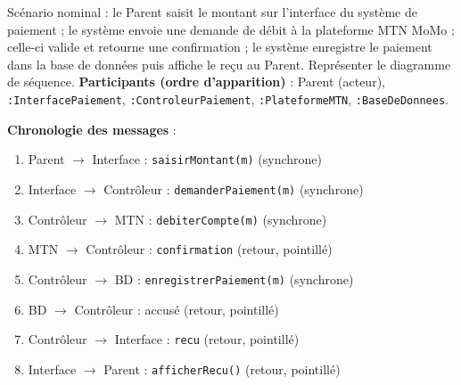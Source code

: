 \documentclass[11pt]{article}
\begin{document}
\begin{exoresolu}
Scénario nominal : le Parent saisit le montant sur l'interface du système de paiement ; le système envoie une demande de débit à la plateforme MTN MoMo ; celle-ci valide et retourne une confirmation ; le système enregistre le paiement dans la base de données puis affiche le reçu au Parent. Représenter le diagramme de séquence.
\tcblower
\textbf{Participants (ordre d'apparition)} : Parent (acteur), \texttt{:InterfacePaiement}, \texttt{:ControleurPaiement}, \texttt{:PlateformeMTN}, \texttt{:BaseDeDonnees}.

\textbf{Chronologie des messages} :
\begin{enumerate}
\item Parent $\rightarrow$ Interface : \texttt{saisirMontant(m)} (synchrone)
\item Interface $\rightarrow$ Contrôleur : \texttt{demanderPaiement(m)} (synchrone)
\item Contrôleur $\rightarrow$ MTN : \texttt{debiterCompte(m)} (synchrone)
\item MTN $\rightarrow$ Contrôleur : \texttt{confirmation} (retour, pointillé)
\item Contrôleur $\rightarrow$ BD : \texttt{enregistrerPaiement(m)} (synchrone)
\item BD $\rightarrow$ Contrôleur : accusé (retour, pointillé)
\item Contrôleur $\rightarrow$ Interface : \texttt{recu} (retour, pointillé)
\item Interface $\rightarrow$ Parent : \texttt{afficherRecu()} (retour, pointillé)
\end{enumerate}


\end{exoresolu}
\end{document}
